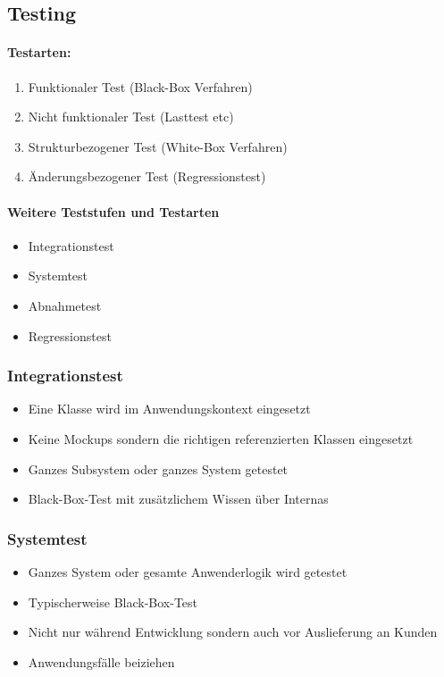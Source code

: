 \documentclass[../ZF_SWEN1.tex]{subfiles}
\begin{document}
\subsection{Testing}
\paragraph{Testarten:}
\begin{enumerate}
	\item Funktionaler Test (Black-Box Verfahren)
	\item Nicht funktionaler Test (Lasttest etc)
	\item Strukturbezogener Test (White-Box Verfahren)
	\item Änderungsbezogener Test (Regressionstest)
\end{enumerate}

\paragraph{Weitere Teststufen und Testarten}
\begin{itemize}
	\item Integrationstest
	\item Systemtest
	\item Abnahmetest
	\item Regressionstest
\end{itemize}

\subsubsection{Integrationstest}
\begin{itemize}
	\item Eine Klasse wird im Anwendungskontext eingesetzt
	\item Keine Mockups sondern die richtigen referenzierten Klassen eingesetzt
	\item Ganzes Subsystem oder ganzes System getestet
	\item Black-Box-Test mit zusätzlichem Wissen über Internas
\end{itemize}


\subsubsection{Systemtest}
\begin{itemize}
	\item Ganzes System oder gesamte Anwenderlogik wird getestet
	\item Typischerweise Black-Box-Test
	\item Nicht nur während Entwicklung sondern auch vor Auslieferung an Kunden
	\item Anwendungsfälle beiziehen
\end{itemize}
\end{document}
